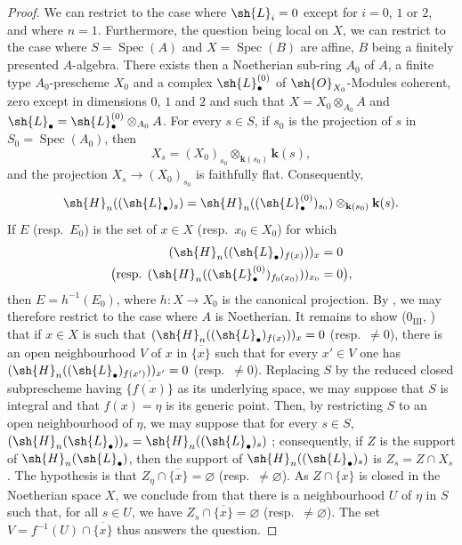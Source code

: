 \begin{proof}
\label{IV.9.9.6-proof}
We can restrict to the case where $\sh{L}_i=0$ except for $i=0$, $1$ or $2$, and where $n=1$.
Furthermore, the question being local on $X$, we can restrict to the case where $S=\operatorname{Spec}(A)$ and $X=\operatorname{Spec}(B)$ are affine, $B$ being a finitely presented $A$-algebra.
There exists then a Noetherian sub-ring $A_0$ of $A$, a finite type $A_0$-prescheme $X_0$ and a complex $\sh{L}_\bullet^{(0)}$ of $\sh{O}_{X_0}$-Modules coherent, zero except in dimensions $0$, $1$ and $2$ and such that $X=X_0\otimes_{A_0}A$ and $\sh{L}_\bullet=\sh{L}_\bullet^{(0)}\otimes_{A_0}A$.
For every $s\in S$, if $s_0$ is the projection of $s$ in $S_0=\operatorname{Spec}(A_0)$, then
\[
  X_s=(X_0)_{s_0}\otimes_{\mathbf{k}(s_0)}\mathbf{k}(s),
\]
and the projection $X_s\to(X_0)_{s_0}$ is faithfully flat.
Consequently,
\[
  \sh{H}_n((\sh{L}_\bullet)_s)
  =\sh{H}_n((\sh{L}_\bullet^{(0)})_{s_0})\otimes_{\mathbf{k}(s_0)}\mathbf{k}(s).
\]
If $E$ (resp.~$E_0$) is the set of $x\in X$ (resp.~$x_0\in X_0$) for which
\[
  \begin{aligned}
  (\sh{H}_n((\sh{L}_\bullet)_{f(x)}))_x&=0\\
  \bigl(\text{resp. }(\sh{H}_n((\sh{L}_\bullet^{(0)})_{f_0(x_0)}))_{x_0}&=0\bigr),
  \end{aligned}
\]
then $E=h^{-1}(E_0)$, where $h:X\to X_0$ is the canonical projection.
By , we may therefore restrict to the case where $A$ is Noetherian.
It remains to show ($0_{\mathrm{III}}$, ) that if $x\in X$ is such that $(\sh{H}_n((\sh{L}_\bullet)_{f(x)}))_x=0$ (resp.~$\neq 0$), there is an open neighbourhood $V$ of $x$ in $\overline{\{x\}}$ such that for every $x'\in V$ one has $(\sh{H}_n((\sh{L}_\bullet)_{f(x')}))_{x'}=0$ (resp.~$\neq 0$).
Replacing $S$ by the reduced closed subprescheme having $\overline{\{f(x)\}}$ as its underlying space, we may suppose that $S$ is integral and that $f(x)=\eta$ is its generic point.
Then, by restricting $S$ to an open neighbourhood of $\eta$, we may suppose that for every $s\in S$,
$(\sh{H}_n(\sh{L}_\bullet))_s=\sh{H}_n((\sh{L}_\bullet)_s)$ ; consequently, if $Z$ is the support of $\sh{H}_n(\sh{L}_\bullet)$, then the support of $\sh{H}_n((\sh{L}_\bullet)_s)$ is $Z_s=Z\cap X_s$ .
The hypothesis is that $Z_\eta\cap\overline{\{x\}}=\varnothing$ (resp.~$\neq\varnothing$).
As $Z\cap\overline{\{x\}}$ is closed in the Noetherian space $X$, we conclude from  that there is a neighbourhood $U$ of $\eta$ in $S$ such that, for all $s\in U$, we have $Z_s\cap\overline{\{x\}}=\varnothing$ (resp.~$\neq\varnothing$).
The set $V=f^{-1}(U)\cap\overline{\{x\}}$ thus answers the question.
\end{proof}

